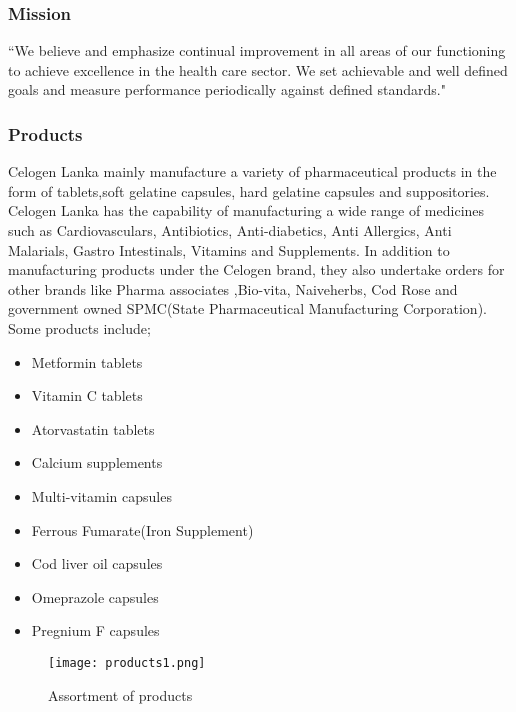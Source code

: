\documentclass[a4paper,12pt]{article}
\begin{document}
			\subsubsection{Mission}
			
			``We believe and emphasize continual improvement in all areas of our functioning to achieve excellence in the health care sector.
			We set achievable and well defined goals and measure performance periodically against defined standards."
		
		\newpage
			\subsubsection{Products}
			
			Celogen Lanka mainly manufacture a variety of pharmaceutical products in the form of tablets,soft gelatine capsules, hard gelatine capsules and suppositories.
			Celogen Lanka has the capability of manufacturing a wide range of medicines such as Cardiovasculars, Antibiotics, Anti-diabetics, Anti Allergics, Anti Malarials, Gastro Intestinals, Vitamins and Supplements.
			In addition to manufacturing products under the Celogen brand, they also undertake orders for other brands like Pharma associates ,Bio-vita, Naiveherbs, Cod Rose and government owned SPMC(State Pharmaceutical Manufacturing Corporation).
			Some products include;	
				\begin{itemize}
					\item Metformin tablets
					\item Vitamin C tablets
					\item Atorvastatin tablets
					\item Calcium supplements
					\item Multi-vitamin capsules
					\item Ferrous Fumarate(Iron Supplement)
					\item Cod liver oil capsules
					\item Omeprazole capsules
					\item Pregnium F capsules
					
				\end{itemize}
									
				\begin{figure}[H]
					\begin{center}				
						\texttt{[image: products1.png]}
					\end{center}
					\caption{Assortment of products}
					\label{fig:Assortment of products}
				\end{figure}		
				
\end{document}
